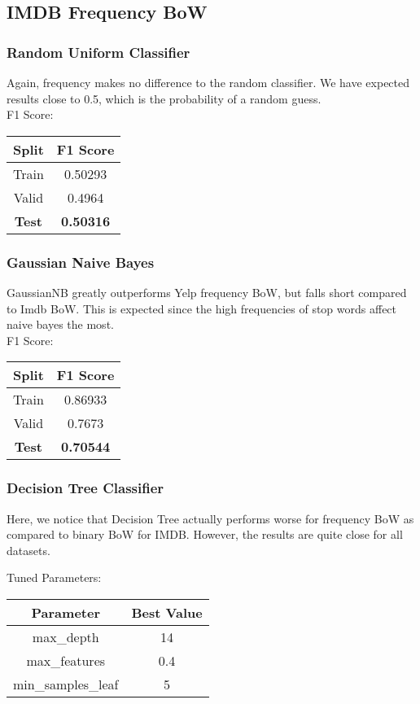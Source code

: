 \documentclass{article}
\begin{document}
\subsection{IMDB Frequency BoW}
\subsubsection{Random Uniform Classifier}
Again, frequency makes no difference to the random classifier. We have expected results close to 0.5, which is the probability of a random guess. \\
F1 Score:
\begin{center}
\begin{tabular}{ |c|c| } 
	\hline
	\textbf{Split} & \textbf{F1 Score} \\ 
	\hline
	Train & 0.50293 \\
	Valid & 0.4964 \\ 
	\textbf{Test} & \textbf{0.50316} \\
	\hline
\end{tabular}
\end{center}

\subsubsection{Gaussian Naive Bayes}
GaussianNB greatly outperforms Yelp frequency BoW, but falls short compared to Imdb BoW. This is expected since the high frequencies of stop words affect naive bayes the most. \\
F1 Score:
\begin{center}
\begin{tabular}{ |c|c| } 
	\hline
	\textbf{Split} & \textbf{F1 Score} \\ 
	\hline
	Train & 0.86933 \\
	Valid & 0.7673 \\ 
	\textbf{Test} & \textbf{0.70544} \\
	\hline
\end{tabular}
\end{center}

\subsubsection{Decision Tree Classifier}
Here, we notice that Decision Tree actually performs worse for frequency BoW as compared to binary BoW for IMDB. However, the results are quite close for all datasets.

Tuned Parameters:
\begin{center}
\begin{tabular}{ |c|c| } 
	\hline
	\textbf{Parameter} & \textbf{Best Value} \\ 
	\hline
	max\_depth & 14 \\ 
    max\_features & 0.4 \\
    min\_samples\_leaf & 5 \\
	\hline
\end{tabular}
\end{center}
\end{document}
